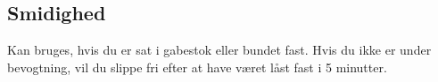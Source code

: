 \subsection{Smidighed}
Kan bruges, hvis du er sat i gabestok eller bundet fast. Hvis du ikke er under bevogtning, vil du slippe fri efter at have været låst fast i 5 minutter.\\